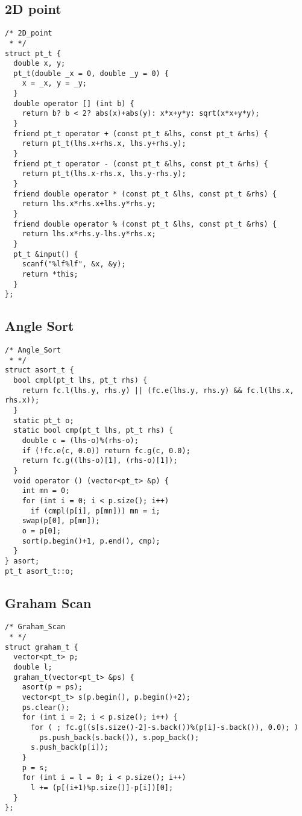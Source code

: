 \subsection{2D point}
\begin{lstlisting}
/* 2D_point
 * */
struct pt_t {
  double x, y;
  pt_t(double _x = 0, double _y = 0) {
    x = _x, y = _y;
  }
  double operator [] (int b) {
    return b? b < 2? abs(x)+abs(y): x*x+y*y: sqrt(x*x+y*y);
  }
  friend pt_t operator + (const pt_t &lhs, const pt_t &rhs) {
    return pt_t(lhs.x+rhs.x, lhs.y+rhs.y);
  }
  friend pt_t operator - (const pt_t &lhs, const pt_t &rhs) {
    return pt_t(lhs.x-rhs.x, lhs.y-rhs.y);
  }
  friend double operator * (const pt_t &lhs, const pt_t &rhs) {
    return lhs.x*rhs.x+lhs.y*rhs.y;
  }
  friend double operator % (const pt_t &lhs, const pt_t &rhs) {
    return lhs.x*rhs.y-lhs.y*rhs.x;
  }
  pt_t &input() {
    scanf("%lf%lf", &x, &y);
    return *this;
  }
};
\end{lstlisting}


\subsection{Angle Sort}
\begin{lstlisting}
/* Angle_Sort
 * */
struct asort_t {
  bool cmpl(pt_t lhs, pt_t rhs) {
    return fc.l(lhs.y, rhs.y) || (fc.e(lhs.y, rhs.y) && fc.l(lhs.x, rhs.x));
  }
  static pt_t o;
  static bool cmp(pt_t lhs, pt_t rhs) {
    double c = (lhs-o)%(rhs-o);
    if (!fc.e(c, 0.0)) return fc.g(c, 0.0);
    return fc.g((lhs-o)[1], (rhs-o)[1]);
  }
  void operator () (vector<pt_t> &p) {
    int mn = 0;
    for (int i = 0; i < p.size(); i++)
      if (cmpl(p[i], p[mn])) mn = i;
    swap(p[0], p[mn]);
    o = p[0];
    sort(p.begin()+1, p.end(), cmp);
  }
} asort;
pt_t asort_t::o;
\end{lstlisting}


\subsection{Graham Scan}
\begin{lstlisting}
/* Graham_Scan
 * */
struct graham_t {
  vector<pt_t> p;
  double l;
  graham_t(vector<pt_t> &ps) {
    asort(p = ps);
    vector<pt_t> s(p.begin(), p.begin()+2);
    ps.clear();
    for (int i = 2; i < p.size(); i++) {
      for ( ; fc.g((s[s.size()-2]-s.back())%(p[i]-s.back()), 0.0); )
        ps.push_back(s.back()), s.pop_back();
      s.push_back(p[i]);
    }
    p = s;
    for (int i = l = 0; i < p.size(); i++)
      l += (p[(i+1)%p.size()]-p[i])[0];
  }
};
\end{lstlisting}


